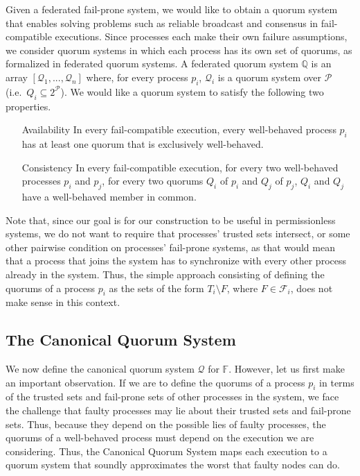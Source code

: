\documentclass[11pt,letterpaper]{article}
\begin{document}
Given a federated fail-prone system, we would like to obtain a quorum system that enables solving problems such as reliable broadcast and consensus in fail-compatible executions.
Since processes each make their own failure assumptions, we consider quorum systems in which each process has its own set of quorums, as formalized in federated quorum systems.
A federated quorum system $\mathbb{Q}$ is an array $\left[\mathcal{Q}_1,...,\mathcal{Q}_n\right]$ where, for every process $p_i$, $\mathcal{Q}_i$ is a quorum system over $\mathcal{P}$ (i.e.\ $Q_i\subseteq 2^{\mathcal{P}}$).
We would like a quorum system to satisfy the following two properties.
\begin{itemize}
  \item[Availability] In every fail-compatible execution, every well-behaved process $p_i$  has at least one quorum that is exclusively well-behaved.
  \item[Consistency] In every fail-compatible execution, for every two well-behaved processes $p_i$ and $p_j$, for every two quorums $Q_i$ of $p_i$ and $Q_j$ of $p_j$, $Q_i$ and $Q_j$ have a well-behaved member in common.
\end{itemize}

Note that, since our goal is for our construction to be useful in permissionless systems, we do not want to require that processes' trusted sets intersect, or some other pairwise condition on processes' fail-prone systems, as that would mean that a process that joins the system has to synchronize with every other process already in the system.
Thus, the simple approach consisting of defining the quorums of a process $p_i$ as the sets of the form $T_i\setminus F$, where $F\in\mathcal{F}_i$, does not make sense in this context.

\subsection{The Canonical Quorum System}

We now define the canonical quorum system $\mathcal{Q}$ for $\mathbb{F}$.
However, let us first make an important observation.
If we are to define the quorums of a process $p_i$ in terms of the trusted sets and fail-prone sets of other processes in the system, we face the challenge that faulty processes may lie about their trusted sets and fail-prone sets.
Thus, because they depend on the possible lies of faulty processes, the quorums of a well-behaved process must depend on the execution we are considering.
Thus, the Canonical Quorum System maps each execution to a quorum system that soundly approximates the worst that faulty nodes can do.
\end{document}
